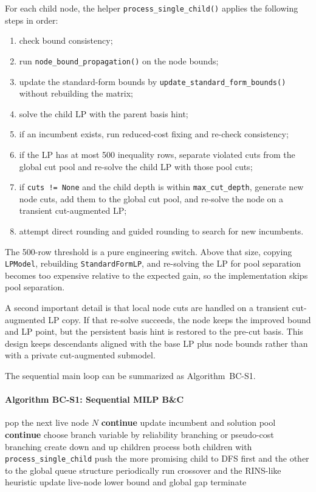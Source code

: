 For each child node, the helper \texttt{process\_single\_child()} applies the following steps in order:
\begin{enumerate}
  \item check bound consistency;
  \item run \texttt{node\_bound\_propagation()} on the node bounds;
  \item update the standard-form bounds by \texttt{update\_standard\_form\_bounds()} without rebuilding the matrix;
  \item solve the child LP with the parent basis hint;
  \item if an incumbent exists, run reduced-cost fixing and re-check consistency;
  \item if the LP has at most 500 inequality rows, separate violated cuts from the global cut pool and re-solve the child LP with those pool cuts;
  \item if \texttt{cuts != None} and the child depth is within \texttt{max\_cut\_depth}, generate new node cuts, add them to the global cut pool, and re-solve the node on a transient cut-augmented LP;
  \item attempt direct rounding and guided rounding to search for new incumbents.
\end{enumerate}

The 500-row threshold is a pure engineering switch. Above that size, copying \texttt{LPModel}, rebuilding \texttt{StandardFormLP}, and re-solving the LP for pool separation becomes too expensive relative to the expected gain, so the implementation skips pool separation.

A second important detail is that local node cuts are handled on a transient cut-augmented LP copy. If that re-solve succeeds, the node keeps the improved bound and LP point, but the persistent basis hint is restored to the pre-cut basis. This design keeps descendants aligned with the base LP plus node bounds rather than with a private cut-augmented submodel.

The sequential main loop can be summarized as Algorithm~BC-S1.

\paragraph{Algorithm BC-S1: Sequential MILP B\&C}
\begin{algorithmic}[1]
    \State pop the next live node \(N\)
     \State \textbf{continue} \EndIf
      \State update incumbent and solution pool
      \State \textbf{continue}
    \EndIf
    \State choose branch variable by reliability branching or pseudo-cost branching
    \State create down and up children
    \State process both children with \texttt{process\_single\_child}
    \State push the more promising child to DFS first and the other to the global queue structure
    \State periodically run crossover and the RINS-like heuristic
    \State update live-node lower bound and global gap
     \State terminate \EndIf
  \EndWhile
\EndProcedure
\end{algorithmic}


